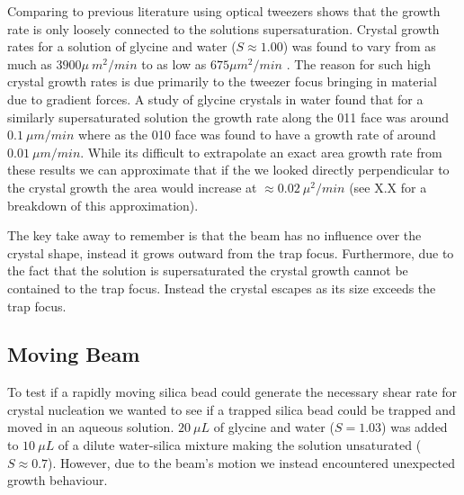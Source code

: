 Comparing to previous literature using optical tweezers shows 
that the growth rate is only loosely connected to the solutions 
supersaturation. Crystal growth rates for a solution of glycine 
and water ($S\approx1.00$) was found to vary from as much as 
$3900 \mu\ m^2/min$ to as low as $675\mu m^2/min$ 
\cite{Flannigan2023}. The reason for such high crystal growth 
rates is due primarily to the tweezer focus bringing in material 
due to gradient forces. A study of glycine crystals in water 
found that for a similarly supersaturated solution the growth 
rate along the {011} face was around $0.1\ \mu m/min$ where as 
the {010} face was found to have a growth rate of around $0.01\ 
\mu m/min$. While its difficult to extrapolate an exact area 
growth rate from these results we can approximate that if the 
we looked directly perpendicular to the crystal growth the area 
would increase at $\approx0.02\ \mu^2/min$ (see X.X for a 
breakdown of this approximation). 

The key take away to remember is that the beam has no influence 
over the crystal shape, instead it grows outward from the trap 
focus. Furthermore, due to the fact that the solution is 
supersaturated the crystal growth cannot be contained to the 
trap focus. Instead the crystal escapes as its size exceeds the 
trap focus. 

\subsection{Moving Beam}
\label{sec:moving}
To test if a rapidly moving silica bead could generate the 
necessary shear rate for crystal nucleation we wanted to 
see if a trapped silica bead could be trapped and moved in 
an aqueous solution. $20\ \mu L$ of glycine and water ($S=
1.03$) was added to $10\ \mu L$ of a dilute water-silica 
mixture making the solution unsaturated ($S\approx0.7$). 
However, due to the beam's motion we instead encountered 
unexpected growth behaviour. 


